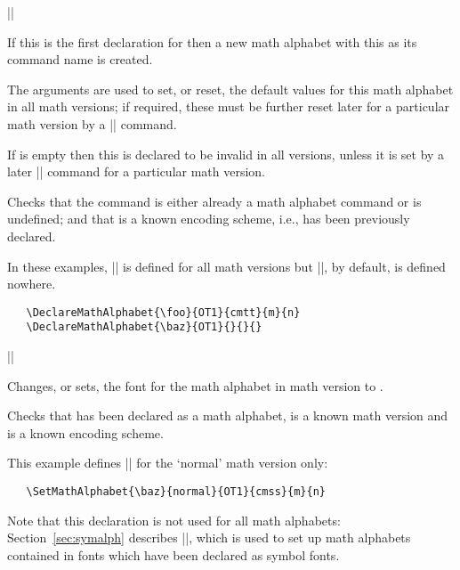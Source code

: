 \documentclass{ltxguide}[1995/11/28]
\begin{document}
\begin{decl}
|\DeclareMathAlphabet|   
                        
\end{decl}
 
If this is the first declaration for  then a new math
alphabet with this as its command name is created.
 
The arguments     are used to
set, or reset, the default values for this math alphabet in all math
versions; if required, these must be further reset later for a
particular math version by a |\SetMathAlphabet| command.

If  is empty then this  is declared to be invalid
in all versions, unless it is set by a later |\SetMathAlphabet|
command for a particular math version.

Checks that the command  is either already a math
alphabet command or is undefined; and that  is a known
encoding scheme, i.e., has been previously declared.
 

In these examples, |\foo| is defined for all math versions but |\baz|,
by default, is defined nowhere.
\begin{verbatim}
   \DeclareMathAlphabet{\foo}{OT1}{cmtt}{m}{n}
   \DeclareMathAlphabet{\baz}{OT1}{}{}{}
\end{verbatim}
 
 
\begin{decl}
|\SetMathAlphabet|  \\
        \null\hfill{}   
\end{decl}
 
Changes, or sets, the font for the math alphabet  in math
version  to .
 
Checks that  has been declared as a math alphabet, 
 is a known math version and  is a known
encoding scheme.
 

This example defines |\baz| for the `normal' math version only:
\begin{verbatim}
   \SetMathAlphabet{\baz}{normal}{OT1}{cmss}{m}{n}
\end{verbatim}
 
Note that this declaration is not used for all math alphabets:
Section~\ref{sec:symalph} describes |\DeclareSymbolFontAlphabet|,
which is used to set up math alphabets contained in fonts which have
been declared as symbol fonts.
 
\end{document}
